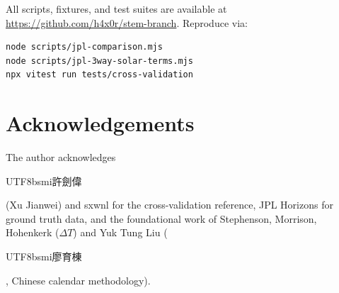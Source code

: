 \documentclass[10pt,a4paper]{article}
\newcommand{\zh}[1]{\begin{CJK}{UTF8}{bsmi}#1\end{CJK}}
\begin{document}
All scripts, fixtures, and test suites are available at
\url{https://github.com/h4x0r/stem-branch}. Reproduce via:

{\small
\begin{verbatim}
node scripts/jpl-comparison.mjs
node scripts/jpl-3way-solar-terms.mjs
npx vitest run tests/cross-validation
\end{verbatim}
}

\section*{Acknowledgements}

The author acknowledges \zh{許劍偉} (Xu Jianwei) and sxwnl for the
cross-validation reference, JPL Horizons for ground truth data, and the
foundational work of Stephenson, Morrison, Hohenkerk ($\Delta T$) and
Yuk Tung Liu (\zh{廖育棟}, Chinese calendar methodology).
\end{document}
